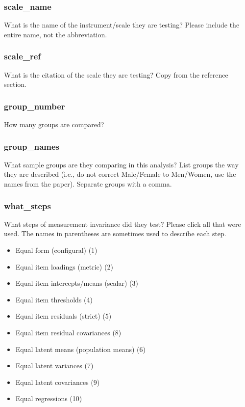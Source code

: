 \documentclass[
  english,
  man]{apa7}
\providecommand{\tightlist}{%
  \setlength{\itemsep}{0pt}\setlength{\parskip}{0pt}}
\begin{document}
\subsubsection{scale\_name}\label{scale_name}

What is the name of the instrument/scale they are testing? Please include the entire name, not the abbreviation.

\subsubsection{scale\_ref}\label{scale_ref}

What is the citation of the scale they are testing? Copy from the reference section.

\subsubsection{group\_number}\label{group_number}

How many groups are compared?

\subsubsection{group\_names}\label{group_names}

What sample groups are they comparing in this analysis? List groups the way they are described (i.e., do not correct Male/Female to Men/Women, use the names from the paper). Separate groups with a comma.

\subsubsection{what\_steps}\label{what_steps}

What steps of measurement invariance did they test? Please click all that were used. The names in parentheses are sometimes used to describe each step.

\begin{itemize}
\tightlist
\item
  Equal form (configural) (1)
\item
  Equal item loadings (metric) (2)
\item
  Equal item intercepts/means (scalar) (3)
\item
  Equal item thresholds (4)
\item
  Equal item residuals (strict) (5)
\item
  Equal item residual covariances (8)
\item
  Equal latent means (population means) (6)
\item
  Equal latent variances (7)
\item
  Equal latent covariances (9)
\item
  Equal regressions (10)
\end{itemize}
\end{document}
